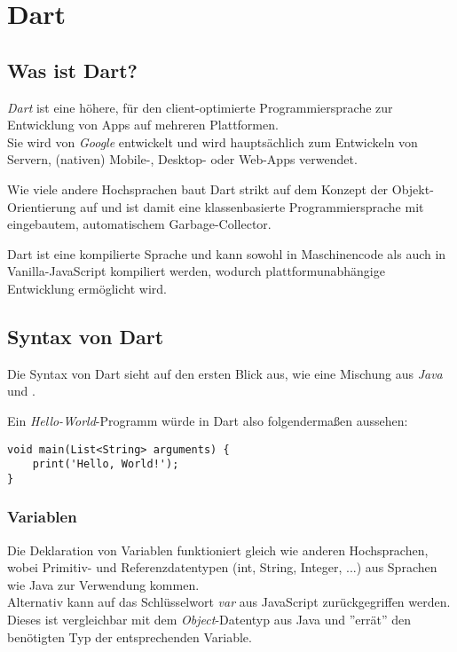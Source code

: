 \section{Dart}

\subsection{Was ist Dart?}

\textit{Dart} ist eine höhere, für den client-optimierte Programmiersprache
zur Entwicklung von Apps auf mehreren Plattformen.\\
Sie wird von \textit{Google} entwickelt und wird hauptsächlich zum Entwickeln von
Servern, (nativen) Mobile-, Desktop- oder Web-Apps verwendet.

Wie viele andere Hochsprachen baut Dart strikt auf dem Konzept der Objekt-Orientierung auf
und ist damit eine klassenbasierte Programmiersprache mit eingebautem, automatischem
Garbage-Collector.

Dart ist eine kompilierte Sprache und kann sowohl in Maschinencode als auch in \\
Vanilla-JavaScript kompiliert werden, wodurch plattformunabhängige Entwicklung ermöglicht 
wird.

\subsection{Syntax von Dart}

Die Syntax von Dart sieht auf den ersten Blick aus, wie eine Mischung aus \textit{Java}\\
und .

Ein \textit{Hello-World}-Programm würde in Dart also folgendermaßen aussehen:
\begin{lstlisting}
void main(List<String> arguments) {
    print('Hello, World!');
}
\end{lstlisting}

\subsubsection{Variablen}

Die Deklaration von Variablen funktioniert gleich wie anderen Hochsprachen,
wobei Primitiv- und Referenzdatentypen (int, String, Integer, ...) aus Sprachen wie Java zur Verwendung
kommen.\\
Alternativ kann auf das Schlüsselwort \textit{var} aus JavaScript zurückgegriffen werden. Dieses
ist vergleichbar mit dem \textit{Object}-Datentyp aus Java und ''errät'' den benötigten
Typ der entsprechenden Variable.

